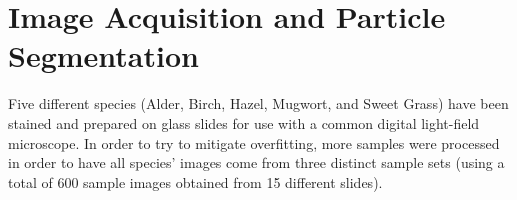 \section{Image Acquisition and Particle Segmentation}

Five different species (Alder, Birch, Hazel, Mugwort, and Sweet Grass) have been stained and prepared on glass slides for use with a common digital light-field microscope. In order to try to mitigate overfitting, more samples were processed in order to have all species’ images come from three distinct sample sets (using a total of 600 sample images obtained from 15 different slides).
  
  
  
  
  